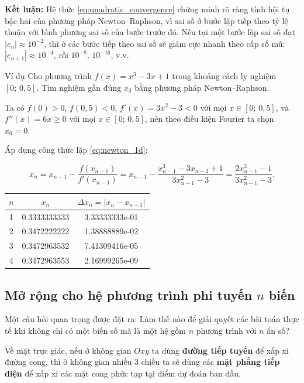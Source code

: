 \textbf{Kết luận:} Hệ thức \eqref{eq:quadratic_convergence} chứng minh rõ ràng tính hội tụ bậc hai của phương pháp Newton–Raphson, vì sai số ở bước lặp tiếp theo tỷ lệ thuận với bình phương sai số của bước trước đó. Nếu tại một bước lặp sai số đạt $|e_n| \approx 10^{-2}$, thì ở các bước tiếp theo sai số sẽ giảm cực nhanh theo cấp số mũ: $|e_{n+1}| \approx 10^{-4}$, rồi $10^{-8}$, $10^{-16}$, v.v.

\begin{bt}{Ví dụ}
    Cho phương trình $f(x) = x^3 - 3x + 1$ trong khoảng cách ly nghiệm $[0;\, 0{,}5]$. Tìm nghiệm gần đúng $x_3$ bằng phương pháp Newton–Raphson.
\end{bt}

Ta có $f(0) > 0$, $f(0{,}5) < 0$, $f'(x) = 3x^2 - 3 < 0$ với mọi $x\in[0;\,0{,}5]$, và $f''(x) = 6x \geq 0$ với mọi $x\in[0;\,0{,}5]$, nên theo điều kiện Fourier ta chọn $x_0 = 0$.

Áp dụng công thức lặp \eqref{eq:newton_1d}:

\begin{equation}
    x_n = x_{n-1} - \frac{f(x_{n-1})}{f'(x_{n-1})}
        = x_{n-1} - \frac{x_{n-1}^3 - 3x_{n-1} + 1}{3x_{n-1}^2 - 3}
        = \frac{2x_{n-1}^3 - 1}{3x_{n-1}^2 - 3}.
    \label{eq:example_iter}
\end{equation}

\begin{table}[h]
\centering
\begin{tabular}{|c|c|c|}
\hline
$n$ & $x_n$ & $\Delta x_n = |x_n - x_{n-1}|$ \\
\hline
1 & 0.3333333333 & 3.33333333e-01 \\
\hline
2 & 0.3472222222 &1.38888889e-02 \\
\hline
3 & 0.3472963532 &7.41309416e-05\\
\hline
4 & 0.3472963553 &2.16999265e-09\\
\hline
\end{tabular}
\end{table}


\subsection{ Mở rộng cho hệ phương trình phi tuyến $n$ biến}

Một câu hỏi quan trọng được đặt ra: Làm thế nào để giải quyết các bài toán thực tế khi không chỉ có một biến số mà là một hệ gồm $n$ phương trình với $n$ ẩn số?

Về mặt trực giác, nếu ở không gian $Oxy$ ta dùng \textbf{đường tiếp tuyến} để xấp xỉ đường cong, thì ở không gian nhiều 3 chiều ta sẽ dùng các \textbf{mặt phẳng tiếp diện} để xấp xỉ các mặt cong phức tạp tại điểm dự đoán ban đầu.

